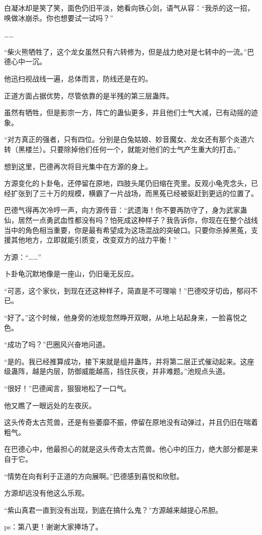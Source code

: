 \begin{this_body}
白凝冰却是笑了笑，面色仍旧平淡，她看向铁心剑，语气从容：“我杀的这一招，唤做冰崩杀。你也想要试一试吗？”

……

“柴火熊牺牲了，这个龙女虽然只有六转修为，但是战力绝对是七转中的一流。”巴德心中一沉。

他迅扫视战线一遍，总体而言，防线还是在的。

正道方面占据优势，尽管依靠的是半残的第三层蛊阵。

虽然有牺牲，但是影宗一方，阵亡的蛊仙更多，并且他们士气大减，已有动摇的迹象。

“对方真正的强者，只有四位。分别是白兔姑娘、妙音魔女、龙女还有那个炎道六转（黑楼兰）。只要除掉他们任何一个，就能对他们的士气产生重大的打击。”

想到这里，巴德再次将目光集中在方源的身上。

方源变化的卜卦龟，还停留在原地，四肢头尾仍旧缩在壳里。反观小龟壳念头，已经扩张到了三十万的规模，横霸了一片战场，而黑菟已经被驱赶到更远的位置了。

巴德气得再次冷哼一声，向方源传音：“武遗海！你不要再防守了，身为武家蛊仙，居然一点勇武血性都没有吗？怕死成这种样子？我告诉你，你现在在整个战线当中的角色相当重要，你是最有希望成为这场混战的突破口。只要你杀掉黑菟，支援其他地方，立即就能引质变，改变双方的战力平衡！”

方源：“……”

卜卦龟沉默地像是一座山，仍旧毫无反应。

“可恶，这个家伙，到现在还这种样子，简直是不可理喻！”巴德咬牙切齿，郁闷不已。

“好了。”这个时候，他身旁的池规忽然睁开双眼，从地上站起身来，一脸喜悦之色。

“成功了吗？”巴圈风兴奋地问道。

“是的。我已经推算成功，接下来就是组并蛊阵，并将第二层正式催动起来。这座级蛊阵，越是内层，防御威能越高，挡住灰夜，并非难题。”池规点头道。

“很好！”巴德闻言，狠狠地松了一口气。

他又瞧了一眼远处的左夜灰。

这头传奇太古荒兽，还是有些萎靡不振，停留在原地没有动弹过，并且仍旧在喘着粗气。

在巴德心中，他最担心的就是这头传奇太古荒兽。他心中的压力，绝大部分都是来自于它。

“情势在向有利于正道的方向展啊。”巴德感到喜悦和欣慰。

方源却远没有他这么乐观。

“紫山真君一直到没有出现，到底在搞什么鬼？”方源越来越提心吊胆。

ps：第八更！谢谢大家捧场了。

\end{this_body}

